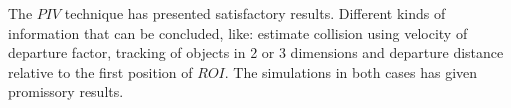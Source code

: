 
The $PIV$ technique has presented satisfactory results. 
Different kinds of information that can 
be concluded, like: estimate collision using velocity of departure factor, 
tracking of objects in 2 or 3 dimensions and departure distance
relative to the first position of $ROI$. 
The simulations in both cases has given promissory results.
